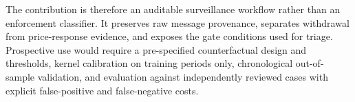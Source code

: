 \documentclass[11pt]{article}
\begin{document}
The contribution is therefore an auditable surveillance workflow rather than an enforcement classifier. It preserves raw
message provenance, separates withdrawal from price-response evidence, and exposes the gate conditions used for triage.
Prospective use would require a pre-specified counterfactual design and thresholds, kernel calibration on training periods
only, chronological out-of-sample validation, and evaluation against independently reviewed cases with explicit
false-positive and false-negative costs.


\end{document}

